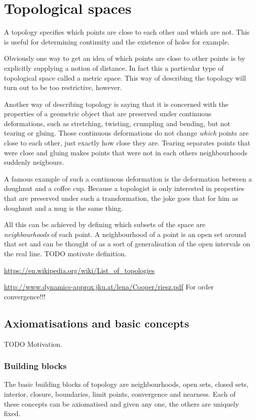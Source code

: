 \chapter{Topological spaces}
A topology specifies which points are close to each other and which are not. This is useful for determining continuity and the existence of holes for example.

Obviously one way to get an idea of which points are close to other points is by explicitly supplying a notion of distance. In fact this a particular type of topological space called a metric space. This way of describing the topology will turn out to be too restrictive, however.

Another way of describing topology is saying that it is concerned with the properties of a geometric object that are preserved under continuous deformations, such as stretching, twisting, crumpling and bending, but not tearing or gluing. Those continuous deformations do not change \textit{which} points are close to each other, just exactly how close they are. Tearing separates points that were close and gluing makes points that were not in each others neighbourhoods suddenly neigbours.

A famous example of such a continuous deformation is the deformation between a doughnut and a coffee cup. Because a topologist is only interested in properties that are preserved under such a transformation, the joke goes that for him as doughnut and a mug is the same thing.

All this can be achieved by defining which subsets of the space are \textit{neighbourhoods} of each point. A neighbourhood of a point is an open set around that set and can be thought of as a sort of generalisation of the open intervals on the real line. TODO motivate definition.

\url{https://en.wikipedia.org/wiki/List_of_topologies}

\url{http://www.dynamics-approx.jku.at/lena/Cooper/riesz.pdf} For order convergence!!!

\section{Axiomatisations and basic concepts}
TODO Motivation.
\subsection{Building blocks}
The basic building blocks of topology are neighbourhoods, open sets, closed sets, interior, closure, boundaries, limit points, convergence and nearness. Each of these concepts can be axiomatised and given any one, the others are uniquely fixed.

